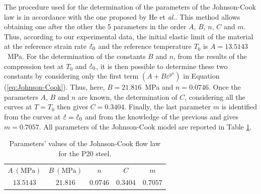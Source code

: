 \documentclass[twoside,english,1p,final,sort&compress]{elsarticle}
\makeatletter
\theoremstyle{plain}
\DeclareRobustCommand{\mdot}[1]{\accentset{\mbox{\bfseries .}}{#1}}
\DeclareRobustCommand{\eal}{et \emph{al.}\@\xspace}
\makeatother
\begin{document}
The procedure used for the determination of the parameters of the Johnson-Cook law is in accordance with the one proposed by He \eal \cite{He-2013}.
This method allows obtaining one after the other the 5 parameters in the order $A$, $B$, $n$, $C$ and $m$.
Thus, according to our experimental data, the initial elastic limit of the material at the reference strain rate $\mdot\varepsilon_0$ and the reference temperature $T_0$ is $A=13.5143$~MPa.
For the determination of the constants $B$ and $n$, from the results of the compression test at $T_0$ and $\mdot\varepsilon_0$, it is then possible to determine these two constants by considering only the first term $\left(A+B\varepsilon^{p^{n}}\right)$ in Equation (\ref{eq:Johnson-Cook}).
Thus, here, $B=21.816$~MPa and $n=0.0746$.
Once the parameters $A$, $B$ and $n$ are known, the determination of $C$, considering all the curves at $T=T_0$ then gives $C=0.3404$.
Finally, the last parameter $m$ is identified from the curves at $\mdot\varepsilon=\mdot\varepsilon_0$ and from the knowledge of the previous and gives $m=0.7057$.
All parameters of the Johnson-Cook model are reported in Table \ref{tab:JC}.

\begin{table}[h!]
\centering
\caption{Parameters' values of the Johnson-Cook flow law for the P20 steel.}
\begin{tabular}{ccccc}
	\hline
	$A~(\text{MPa})$ & $B~(\text{MPa})$ &   $n$    &   $C$    &   $m$    \\
	   $13.5143$     &     $21.816$     & $0.0746$ & $0.3404$ & $0.7057$ \\ \hline
\end{tabular}
\label{tab:JC}
\end{table}
\end{document}
